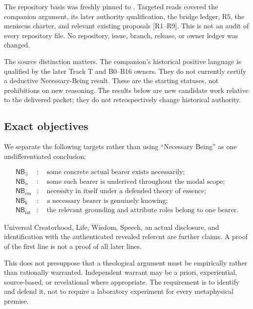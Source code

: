 \documentclass[11pt,a4paper]{article}
\begin{document}
The repository basis was freshly pinned to
. Targeted reads covered
the companion argument, its later authority qualification, the bridge
ledger, R5, the meniscus charter, and relevant existing proposals
{[}R1--R9{]}. This is not an audit of every repository file. No
repository, issue, branch, release, or owner ledger was changed.

The source distinction matters. The companion's historical positive
language is qualified by the later Track T and B0--B16 owners. They do
not currently certify a deductive Necessary-Being result. These are the
starting statuses, not prohibitions on new reasoning. The results below
are new candidate work relative to the delivered packet; they do not
retrospectively change historical authority.

\subsection{Exact objectives}\label{exact-objectives}

We separate the following targets rather than using ``Necessary Being''
as one undifferentiated conclusion:

\nopagebreak[4]

\[
\begin{aligned}
\mathsf{NB}_{\exists}&:\quad\text{some concrete actual bearer exists necessarily};\\
\mathsf{NB}_{\mathrm{u}}&:\quad\text{some such bearer is underived throughout the modal scope};\\
\mathsf{NB}_{\mathrm{ess}}&:\quad\text{necessity in itself under a defended theory of essence};\\
\mathsf{NB}_{\mathrm{k}}&:\quad\text{a necessary bearer is genuinely knowing};\\
\mathsf{NB}_{\mathrm{int}}&:\quad\text{the relevant grounding and attribute roles belong to one bearer}.
\end{aligned}
\]

Universal Creatorhood, Life, Wisdom, Speech, an actual disclosure, and
identification with the authenticated revealed referent are further
claims. A proof of the first line is not a proof of all later lines.

This does not presuppose that a theological argument must be empirically
rather than rationally warranted. Independent warrant may be a priori,
experiential, source-based, or revelational where appropriate. The
requirement is to identify and defend it, not to require a laboratory
experiment for every metaphysical premise.
\end{document}
